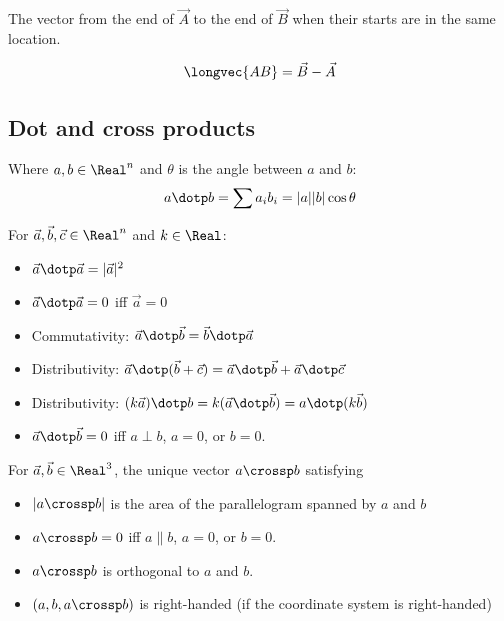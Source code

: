 \begin{definition}
  The vector from the end of $\vec{A}$ to the end of $\vec{B}$ when their starts are in the same location.

  \[
    \longvec{AB} = \vec{B} - \vec{A}
  \]
\end{definition}

\subsection{Dot and cross products}

\begin{definition}
  Where $a, b \in \Real^n$ and $\theta$ is the angle between $a$ and $b$:
  \[
    a \dotp b = \sum a_i b_i = |a| |b| \cos \theta
  \]
\end{definition}

\begin{theorem}
  For $\vec{a}, \vec{b}, \vec{c} \in \Real^n$ and $k \in \Real$:
  \begin{itemize}
    \item $\vec{a} \dotp \vec{a} = |\vec{a}|^2$
    \item $\vec{a} \dotp \vec{a} = 0$ iff $\vec{a} = 0$
    \item Commutativity: $\vec{a} \dotp \vec{b} = \vec{b} \dotp \vec{a}$
    \item Distributivity: $\vec{a} \dotp (\vec{b} + \vec{c}) = \vec{a} \dotp \vec{b} + \vec{a} \dotp \vec{c}$
    \item Distributivity: $(k \vec{a}) \dotp b = k(\vec{a} \dotp \vec{b}) = a \dotp (k \vec{b})$
    \item $\vec{a} \dotp \vec{b} = 0$ iff $a \perp b$, $a = 0$, or $b = 0$.
  \end{itemize}
\end{theorem}

\begin{definition}
  For $\vec{a}, \vec{b} \in \Real^3$, the unique vector $a \crossp b$ satisfying
  \begin{itemize}
    \item $|a \crossp b|$ is the area of the parallelogram spanned by $a$ and $b$
    \item $a \crossp b = 0$ iff $a \parallel b$, $a = 0$, or $b = 0$.
    \item $a \crossp b$ is orthogonal to $a$ and $b$.
    \item $(a, b, a \crossp b)$ is right-handed (if the coordinate system is right-handed)
  \end{itemize}
\end{definition}

